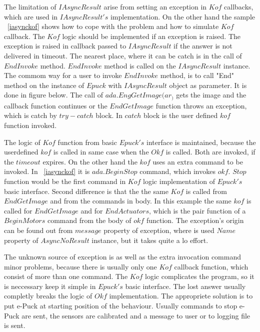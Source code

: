 	The limitation of $IAsyncResult$ arise from setting an exception in $Kof$ callbacks,
	which are used in $IAsyncResult's$ implementation.
	On the other hand the sample ~\ref{iasynckof} shows how to cope with the problem
	and how to simulate $Kof$ callback.
	The $Kof$ logic should be implemented if an exception is raised. 
	The exception is raised in callback passed to $IAsyncResult$ if the answer is not delivered in timeout. 
	The nearest place, where it can be catch is in the call of $EndInvoke$ method.
	$EndInvoke$ method is called on the $IAsyncResult$ instance. 
	The commom way for a user to invoke $EndInvoke$ method, is to call "End" method 
	on the instance of $Epuck$ with $IAsyncResult$ object as parameter. 
	It is done in figure below.
	The call of $ada.EngGetImage(ar_)$ gets the image and the callback function continues
	or the $EndGetImage$ function throws an exception, which is catch by $try-catch$ block.
	In $catch$ block is the user defined $kof$ function invoked.
	
	The logic of $Kof$ function from basic $Epuck's$ interface is maintained, because the userdefined
	$kof$ is called in same case when the $Okf$ is called. Both are invoked, if the $timeout$ expires.
	On the other hand the $kof$ uses an extra command to be invoked. In ~\ref{iasynckof} it
	is $ada.BeginStop$ command, which invokes $okf$. $Stop$ function would be the first command
	in $Kof$ logic implementation of $Epuck's$ basic interface.
	Second difference is that the the same $Kof$ is called from $EndGetImage$ and from the
	commands in body. In this example the same $kof$ is called for $EndGetImage$ and for
	$EndActuators$, which is the pair function of a $BeginMotors$ command from the body of $okf$ function.
	The exception's origin can be found out from $message$ property of exception, where is used $Name$ property of $AsyncNoResult$ instance,
	but it takes quite a lo effort.

	The unknown source of exception is as well as the extra invocation command minor problems, because
	there is usually only one $Kof$ callback function, which consist of more than one command. 
	The $Kof$ logic complicates the program, so it is neccessary keep it simple in $Epuck's$ basic interface.
	The lost answer usually completly breaks the logic of $Okf$ implementation. The appropriete solution is to put e-Puck
	at starting position of the behaviour. Usually commands to stop e-Puck are sent, the sensors are calibrated and a message to user or to logging file
	is sent.


